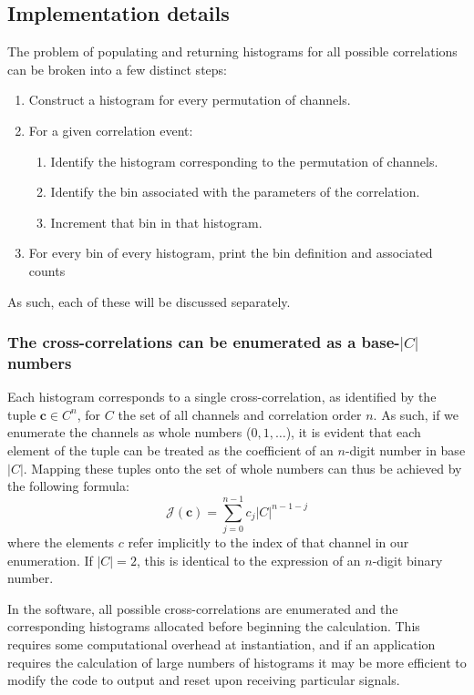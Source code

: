 \documentclass{article}
\renewcommand{\vec}{\boldsymbol}
\newcommand{\abs}[1]{\ensuremath{\left|#1\right|}}
\newcommand{\channel}{\ensuremath{c}}
\newcommand{\channels}{\ensuremath{C}}
\newcommand{\Index}{\ensuremath{\mathcal{J}}}
\begin{document}
\subsection{Implementation details}
The problem of populating and returning histograms for all possible correlations can be broken into a few distinct steps:
\begin{enumerate}
\item Construct a histogram for every permutation of channels.
\item For a given correlation event:
  \begin{enumerate}
  \item Identify the histogram corresponding to the permutation of channels.
  \item Identify the bin associated with the parameters of the correlation.
  \item Increment that bin in that histogram.
  \end{enumerate}
\item For every bin of every histogram, print the bin definition and associated counts
\end{enumerate}
As such, each of these will be discussed separately.

\subsubsection{The cross-correlations can be enumerated as a base-$\abs{\channels}$ numbers}
Each histogram corresponds to a single cross-correlation, as identified by the tuple $\vec{\channel}\in\channels^{n}$, for $\channels$ the set of all channels and correlation order $n$. As such, if we enumerate the channels as whole numbers ($0, 1, \ldots$), it is evident that each element of the tuple can be treated as the coefficient of an $n$-digit number in base $\abs{\channels}$. Mapping these tuples onto the set of whole numbers can thus be achieved by the following formula:
\begin{equation}
\Index(\vec{\channel}) = \sum_{j=0}^{n-1}{\channel_{j}\abs{\channels}^{n-1-j}}
\end{equation}
where the elements $\channel$ refer implicitly to the index of that channel in our enumeration.
If $\abs{\channels}=2$, this is identical to the expression of an $n$-digit binary number.

In the software, all possible cross-correlations are enumerated and the corresponding histograms allocated before beginning the calculation. This requires some computational overhead at instantiation, and if an application requires the calculation of large numbers of histograms it may be more efficient to modify the code to output and reset upon receiving particular signals.
\end{document}

